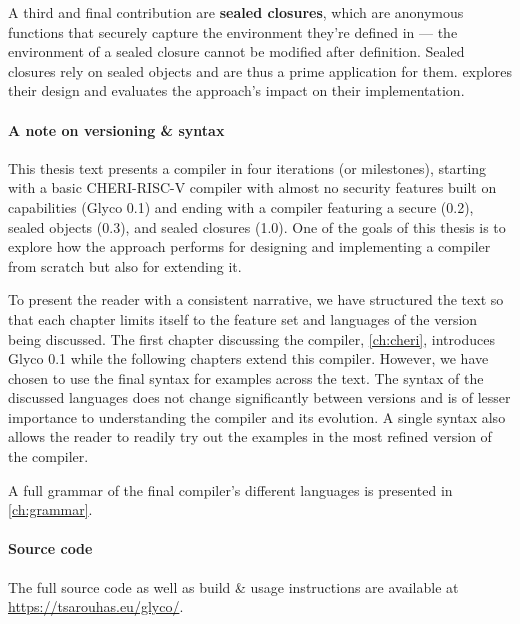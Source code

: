 \documentclass[main.tex]{subfiles}
\begin{document}
A third and final contribution are \textbf{sealed closures}, which are anonymous functions that securely capture the environment they're defined in — the environment of a sealed closure cannot be modified after definition. Sealed closures rely on sealed objects and are thus a prime application for them.  explores their design and evaluates the  approach's impact on their implementation.

\paragraph{A note on versioning \& syntax} This thesis text presents a compiler in four iterations (or milestones), starting with a basic CHERI-RISC-V compiler with almost no security features built on capabilities (Glyco 0.1) and ending with a compiler featuring a secure  (0.2), sealed objects (0.3), and sealed closures (1.0). One of the goals of this thesis is to explore how the  approach performs for designing and implementing a compiler from scratch but also for extending it.

To present the reader with a consistent narrative, we have structured the text so that each chapter limits itself to the feature set and languages of the version being discussed. The first chapter discussing the compiler, \cref{ch:cheri}, introduces Glyco 0.1 while the following chapters extend this compiler. However, we have chosen to use the final syntax for examples across the text. The syntax of the discussed languages does not change significantly between versions and is of lesser importance to understanding the compiler and its evolution. A single syntax also allows the reader to readily try out the examples in the most refined version of the compiler.

A full grammar of the final compiler's different languages is presented in \cref{ch:grammar}.

\paragraph{Source code} The full source code as well as build \& usage instructions are available at \url{https://tsarouhas.eu/glyco/}.

\biblio{}
\onlyinsubfile{\glsaddall\printglossaries}
\end{document}
